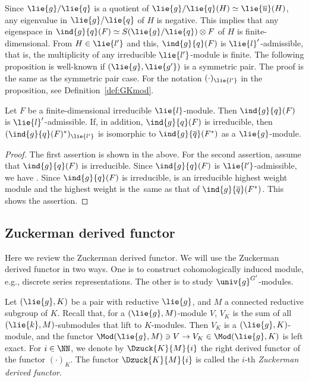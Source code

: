 Since $\lie{g}/\lie{q}$ is a quotient of $\lie{g}/\lie{q}(H)\simeq \lie{\overline{u}}(H)$, any eigenvalue in $\lie{g}/\lie{q}$ of $H$ is negative.
This implies that any eigenspace in $\ind{g}{q}(F)\simeq S(\lie{g}/\lie{q})\otimes F$ of $H$ is finite-dimensional.
From $H \in \lie{l'}$ and this, $\ind{g}{q}(F)$ is $\lie{l}'$-admissible, that is, the multiplicity of any irreducible $\lie{l'}$-module is finite.
The following proposition is well-known if $(\lie{g}, \lie{g'})$ is a symmetric pair.
The proof is the same as the symmetric pair case.
For the notation $(\cdot)_{\lie{l'}}$ in the proposition, see Definition~\ref{def:GKmod}.

\begin{Proposition}\label{prop:AdmissibleDual}
	Let $F$ be a finite-dimensional irreducible $\lie{l}$-module.
	Then $\ind{g}{q}(F)$ is $\lie{l}'$-admissible.
	If, in addition, $\ind{g}{q}(F)$ is irreducible, then $(\ind{g}{q}(F)^*)_{\lie{l'}}$ is isomorphic to
	$\ind{g}{\overline{q}}(F^*)$ as a $\lie{g}$-module.
\end{Proposition}

\begin{proof}
	The first assertion is shown in the above.
	For the second assertion, assume that $\ind{g}{q}(F)$ is irreducible.
	Since $\ind{g}{q}(F)$ is $\lie{l'}$-admissible, we have .
	Since $\ind{g}{q}(F)$ is irreducible,  is an irreducible highest weight module
	and the highest weight is the~same as that of $\ind{g}{\overline{q}}(F^*)$.
	This shows the assertion.
\end{proof}

\subsection{Zuckerman derived functor}

Here we review the Zuckerman derived functor.
We will use the Zuckerman derived functor in two ways.
One is to construct cohomologically induced module, e.g., discrete series representations.
The other is to study $\univ{g}^{G'}$-modules.

Let $(\lie{g}, K)$ be a pair with reductive $\lie{g}$,
and $M$ a connected reductive subgroup of $K$.
Recall that, for a $(\lie{g}, M)$-module $V$, $V_K$ is the sum of all $(\lie{k}, M)$-submodules that lift to $K$-modules.
Then $V_K$ is a $(\lie{g}, K)$-module,
and the functor $\Mod(\lie{g}, M) \ni V \rightarrow V_K \in \Mod(\lie{g}, K)$ is left exact.
For $i \in \NN$, we denote by $\Dzuck{K}{M}{i}$ the right derived functor of the functor $(\cdot)_K$.
The functor $\Dzuck{K}{M}{i}$ is called the $i$-th \emph{Zuckerman derived functor}.


